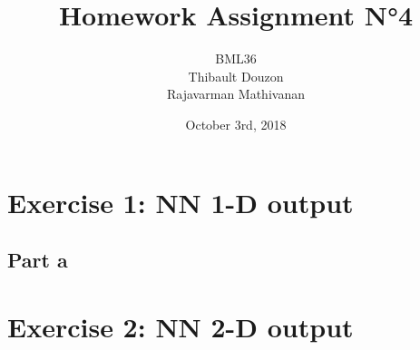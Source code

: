 \documentclass[a4paper, 10pt]{article}
\title{Homework Assignment N°4}
\author{BML36\\Thibault Douzon\\Rajavarman Mathivanan}
\date{October 3rd, 2018}
\begin{document}
\maketitle

\pagebreak

\tableofcontents

\pagebreak
\section{Exercise 1: NN 1-D output}
\subsection{Part a}

\section{Exercise 2: NN 2-D output}
\end{document}
